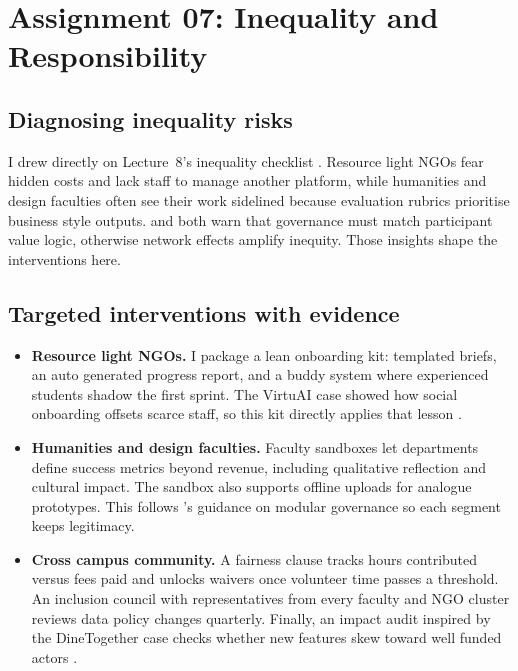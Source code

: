 \section*{Assignment 07: Inequality and Responsibility}

\subsection*{Diagnosing inequality risks}
I drew directly on Lecture~8's inequality checklist \citep{Lecture08}. Resource light NGOs fear hidden costs and lack staff to manage another platform, while humanities and design faculties often see their work sidelined because evaluation rubrics prioritise business style outputs. \citet{Srnicek2017} and \citet{Choudary2016} both warn that governance must match participant value logic, otherwise network effects amplify inequity. Those insights shape the interventions here.

\subsection*{Targeted interventions with evidence}
\begin{itemize}
  \item \textbf{Resource light NGOs.} I package a lean onboarding kit: templated briefs, an auto generated progress report, and a buddy system where experienced students shadow the first sprint. The VirtuAI case showed how social onboarding offsets scarce staff, so this kit directly applies that lesson \citep{Gunasilan2024}.
  \item \textbf{Humanities and design faculties.} Faculty sandboxes let departments define success metrics beyond revenue, including qualitative reflection and cultural impact. The sandbox also supports offline uploads for analogue prototypes. This follows \citet{Reillier2017}'s guidance on modular governance so each segment keeps legitimacy.
  \item \textbf{Cross campus community.} A fairness clause tracks hours contributed versus fees paid and unlocks waivers once volunteer time passes a threshold. An inclusion council with representatives from every faculty and NGO cluster reviews data policy changes quarterly. Finally, an impact audit inspired by the DineTogether case checks whether new features skew toward well funded actors \citep{Rennella2023}.
\end{itemize}

